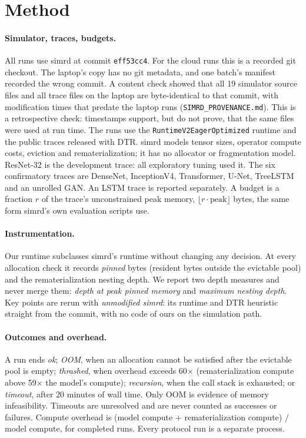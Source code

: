 \documentclass[11pt]{article}
\begin{document}
\section{Method}\label{sec:method}
\paragraph{Simulator, traces, budgets.} All runs use simrd at commit
\texttt{eff53cc4}. For the cloud runs this is a recorded git checkout. The laptop's copy
has no git metadata, and one batch's manifest recorded the wrong commit. A content check
showed that all 19 simulator source files and all trace files on the laptop are
byte-identical to that commit, with modification times that predate the laptop runs
(\texttt{SIMRD\_PROVENANCE.md}). This is a retrospective check: timestamps support, but do
not prove, that the same files were used at run time. The runs use the \texttt{RuntimeV2Eager\-Optimized} runtime and the public traces
released with DTR. simrd models tensor sizes, operator compute costs, eviction and
rematerialization; it has no allocator or fragmentation model. ResNet-32 is the development
trace: all exploratory tuning used it. The six confirmatory traces are DenseNet,
InceptionV4, Transformer, U-Net, TreeLSTM and an unrolled GAN. An LSTM trace is
reported separately. A budget is a fraction $r$ of the trace's unconstrained peak memory,
$\lfloor r \cdot \mathrm{peak}\rfloor$ bytes, the same form simrd's own evaluation scripts
use.

\paragraph{Instrumentation.} Our runtime subclasses simrd's runtime without changing any
decision. At every allocation check it records \emph{pinned} bytes (resident bytes outside
the evictable pool) and the rematerialization nesting depth. We report two depth measures
and never merge them: \emph{depth at peak pinned memory} and \emph{maximum nesting depth}.
Key points are rerun with \emph{unmodified simrd}: its runtime and DTR heuristic straight
from the commit, with no code of ours on the simulation path.

\paragraph{Outcomes and overhead.} A run ends \emph{ok}; \emph{OOM}, when an allocation
cannot be satisfied after the evictable pool is empty; \emph{thrashed}, when overhead
exceeds 60$\times$ (rematerialization compute above 59$\times$ the model's compute); \emph{recursion}, when the
call stack is exhausted; or \emph{timeout}, after 20 minutes of wall time. Only OOM is
evidence of memory infeasibility. Timeouts are unresolved and are never counted as
successes or failures. Compute overhead is (model compute + rematerialization compute) /
model compute, for completed runs. Every protocol run is a separate process.
\end{document}

